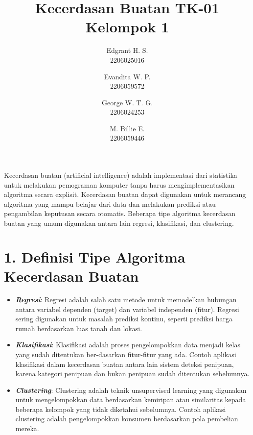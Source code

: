 \documentclass[a4paper]{article}
\begin{document}
\title{Kecerdasan Buatan TK-01 Kelompok 1}

\date{}

\author{
    Edgrant H. S.\\
    2206025016
    \and
    Evandita W.  P.\\
    2206059572
    \and
    George W. T. G.\\
    2206024253
    \and
    M. Billie E.\\
    2206059446
}


\maketitle

Kecerdasan buatan (artificial intelligence) adalah implementasi dari statistika untuk melakukan pemograman komputer tanpa harus mengimplementasikan algoritma secara explisit. Kecerdasan buatan dapat digunakan untuk merancang algoritma yang mampu belajar dari data dan melakukan prediksi atau pengambilan keputusan secara otomatis. Beberapa tipe algoritma kecerdasan buatan yang umum digunakan antara lain regresi, klasifikasi, dan clustering.

\section*{1. Definisi Tipe Algoritma Kecerdasan Buatan}
\begin{itemize}
    \item \textbf{\textit{Regresi}}: Regresi adalah salah satu metode untuk memodelkan hubungan antara variabel dependen (target) dan variabel independen (fitur). Regresi sering digunakan untuk masalah prediksi kontinu, seperti prediksi harga rumah berdasarkan luas tanah dan lokasi.

    \item \textbf{\textit{Klasifikasi}}: Klasifikasi adalah proses pengelompokkan data menjadi kelas yang sudah ditentukan ber-dasarkan fitur-fitur yang ada. Contoh aplikasi klasifikasi dalam kecerdasan buatan antara lain sistem deteksi penipuan, karena kategori penipuan dan bukan penipuan sudah ditentukan sebelumnya.

    \item \textbf{\textit{Clustering}}: Clustering adalah teknik unsupervised learning yang digunakan untuk mengelompokkan data berdasarkan kemiripan atau similaritas kepada beberapa kelompok yang tidak diketahui sebelumnya. Contoh aplikasi clustering adalah pengelompokkan konsumen berdasarkan pola pembelian mereka.

\end{itemize}
\end{document}

